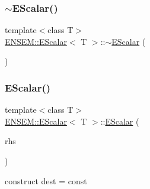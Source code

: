 \mbox{\label{classENSEM_1_1EScalar_addb090b46c2b6abdff79eb52bad58091}} 
\subsubsection{\texorpdfstring{$\sim$EScalar()}{~EScalar()}\hspace{0.1cm}{\footnotesize\ttfamily [2/2]}}
{\footnotesize\ttfamily template$<$class T$>$ \\
\mbox{\hyperlink{classENSEM_1_1EScalar}{E\+N\+S\+E\+M\+::\+E\+Scalar}}$<$ T $>$\+::$\sim$\mbox{\hyperlink{classENSEM_1_1EScalar}{E\+Scalar}} (\begin{DoxyParamCaption}{ }\end{DoxyParamCaption})\hspace{0.3cm}{\ttfamily [inline]}}

\mbox{\label{classENSEM_1_1EScalar_ad064adaa15e67106893182ba57c6fd91}} 
\subsubsection{\texorpdfstring{EScalar()}{EScalar()}\hspace{0.1cm}{\footnotesize\ttfamily [8/12]}}
{\footnotesize\ttfamily template$<$class T$>$ \\
\mbox{\hyperlink{classENSEM_1_1EScalar}{E\+N\+S\+E\+M\+::\+E\+Scalar}}$<$ T $>$\+::\mbox{\hyperlink{classENSEM_1_1EScalar}{E\+Scalar}} (\begin{DoxyParamCaption}\item[{const typename \mbox{\hyperlink{structENSEM_1_1WordType}{Word\+Type}}$<$ T $>$\+::Type\+\_\+t \&}]{rhs }\end{DoxyParamCaption})\hspace{0.3cm}{\ttfamily [inline]}}



construct dest = const 

